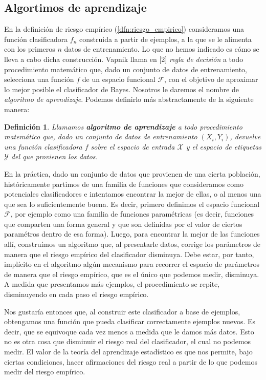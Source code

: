 \documentclass{report}
\newtheorem{dfn}{Definición}[section]
\begin{document}
\subsection{Algortimos de aprendizaje}

En la definición de riesgo empírico (\ref{dfn:riesgo_empirico}) consideramos una función clasificadora $f_n$ construida a partir
de ejemplos, a la que se le alimenta con los primeros $n$ datos de entrenamiento. Lo que no hemos indicado es cómo se lleva a cabo dicha construcción. 
Vapnik llama en [2] \textit{regla de decisión } a todo procedimiento matemático que, dado un conjunto de datos de entrenamiento, selecciona una función 
$f$ de un espacio funcional $\mathcal{F}$, con el objetivo de aproximar lo mejor posible el clasificador de Bayes. Nosotros le daremos el nombre de
\textit{algoritmo de aprendizaje}. Podemos definirlo más abstractamente de la siguiente manera:

\begin{dfn}
Llamamos \textbf{algoritmo de aprendizaje} a todo procedimiento matemático que, dado un conjunto
de datos de entrenamiento $(X_i,Y_i)$, devuelve una función clasificadora $f$ sobre el espacio de entrada $\mathcal{X}$ y el espacio de etiquetas $\mathcal{Y}$ del que
provienen los datos.
\end{dfn}

En la práctica, dado un conjunto de datos que provienen de una cierta población, históricamente partimos de una familia de funciones que
consideramos como potenciales clasificadores e intentamos encontrar la mejor de ellas, o al menos una que sea lo suficientemente buena. Es decir,
primero definimos el espacio funcional $\mathcal{F}$, por ejemplo como una familia de funciones paramétricas (es decir, funciones que comparten
una forma general y que son definidas por el valor de ciertos paramétros dentro de esa forma). Luego, para encontrar la mejor de 
las funciones allí, construímos un algoritmo que, al presentarle datos, corrige los parámetros de manera que el riesgo empírico del clasificador 
disminuya. Debe estar, por tanto, implícito en el algoritmo algún mecanismo para recorrer el espacio de parámetros de manera que el riesgo empírico,
que es el único que podemos medir, disminuya. A medida que presentamos más ejemplos, el procedimiento se repite, disminuyendo en cada paso el riesgo
empírico. \newline

Nos gustaría entonces que, al construir este clasificador a base de ejemplos, obtengamos una función que pueda clasificar correctamente
ejemplos nuevos. Es decir, que se equivoque cada vez menos a medida que le damos más datos. Esto no es otra cosa que disminuir el riesgo real 
del clasificador, el cual no podemos medir. El valor de la teoría del aprendizaje estadístico es que nos permite, bajo ciertas condiciones,
hacer afirmaciones del riesgo real a partir de lo que podemos medir del riesgo empírico.\newline
\end{document}
